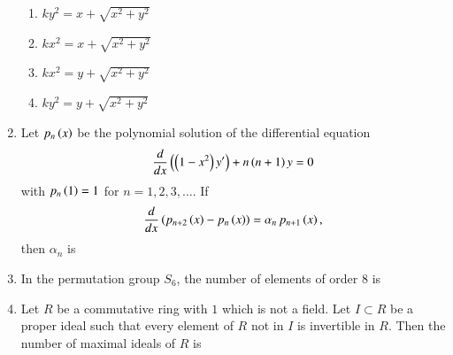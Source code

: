 \documentclass[journal,12pt,onecolumn]{IEEEtran}
\theoremstyle{remark}
\begin{document}
\begin{enumerate}[start=10]
\hfill{}

\begin{enumerate}

\item $k y^{2}= x+\sqrt{x^{2}+y^{2}}$
\item $k x^{2}= x+\sqrt{x^{2}+y^{2}}$
\item $k x^{2}= y+\sqrt{x^{2}+y^{2}}$
\item $k y^{2}= y+\sqrt{x^{2}+y^{2}}$
\end{enumerate}

\item Let $p_n\left(x\right)$ be the polynomial solution of the differential equation
\begin{align*}
\frac{d}{dx}\left(\left(1- x^2\right)y'\right) + n\left(n+ 1\right)y = 0
\end{align*}
with $p_n\left(1\right) = 1$ for $n = 1, 2, 3, \ldots$. If
\begin{align*}
\frac{d}{dx}\left(p_{n+2}\left(x\right)- p_n\left(x\right)\right) = \alpha_n\,p_{n+1}\left(x\right),
\end{align*}
then $\alpha_n$ is

\hfill{}
\begin{enumerate}
\end{enumerate}

\item In the permutation group $S_{6}$, the number of elements of order $8$ is

\hfill{}
\begin{enumerate}
\end{enumerate}
\newpage
\item Let $R$ be a commutative ring with $1$  which is not a field. Let $I \subset R$ be a proper ideal
such that every element of $R$ not in $I$ is invertible in $R$. Then the number of maximal ideals of
$R$ is


\end{enumerate}
\end{document}
